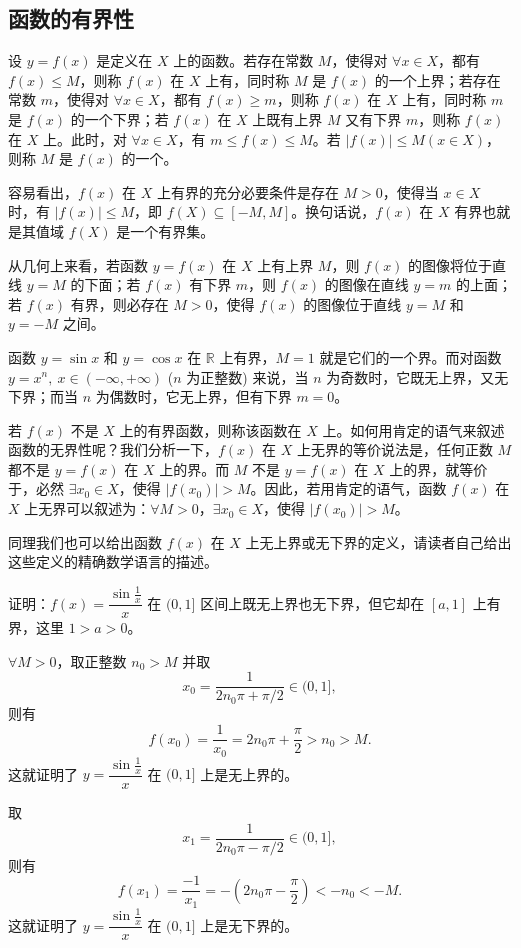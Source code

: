 \documentclass[UTF8,12pt,a4paper,fontset=fandol]{ctexbook}
\begin{document}
\subsection{函数的有界性}

设 $y=f(x)$ 是定义在 $X$ 上的函数。若存在常数 $M$，使得对 $\forall x\in X$，都有 $f(x)\le M$，则称 $f(x)$ 在 $X$ 上有，同时称 $M$ 是 $f(x)$ 的一个上界；若存在常数 $m$，使得对 $\forall x\in X$，都有 $f(x)\ge m$，则称 $f(x)$ 在 $X$ 上有，同时称 $m$ 是 $f(x)$ 的一个下界；若 $f(x)$ 在 $X$ 上既有上界 $M$ 又有下界 $m$，则称 $f(x)$ 在 $X$ 上。此时，对 $\forall x\in X$，有 $m\le f(x)\le M$。若 $|f(x)|\le M(x\in X)$，则称 $M$ 是 $f(x)$ 的一个。

容易看出，$f(x)$ 在 $X$ 上有界的充分必要条件是存在 $M>0$，使得当 $x\in X$ 时，有 $|f(x)|\le M$，即 $f(X)\subseteq[-M,M]$。换句话说，$f(x)$ 在 $X$ 有界也就是其值域 $f(X)$ 是一个有界集。

从几何上来看，若函数 $y=f(x)$ 在 $X$ 上有上界 $M$，则 $f(x)$ 的图像将位于直线 $y=M$ 的下面；若 $f(x)$ 有下界 $m$，则 $f(x)$ 的图像在直线 $y=m$ 的上面；若 $f(x)$ 有界，则必存在 $M>0$，使得 $f(x)$ 的图像位于直线 $y=M$ 和 $y=-M$ 之间。

\noindent{}\quad 函数 $y=\sin x$ 和 $y=\cos x$ 在 $\mathbb{R}$ 上有界，$M=1$ 就是它们的一个界。而对函数 $y=x^n,\ x\in(-\infty,+\infty)$ ($n$ 为正整数) 来说，当 $n$ 为奇数时，它既无上界，又无下界；而当 $n$ 为偶数时，它无上界，但有下界 $m=0$。

若 $f(x)$ 不是 $X$ 上的有界函数，则称该函数在 $X$ 上。如何用肯定的语气来叙述函数的无界性呢？我们分析一下，$f(x)$ 在 $X$ 上无界的等价说法是，任何正数 $M$ 都不是 $y=f(x)$ 在 $X$ 上的界。而 $M$ 不是 $y=f(x)$ 在 $X$ 上的界，就等价于，必然 $\exists x_0\in X$，使得 $|f(x_0)|>M$。因此，若用肯定的语气，函数 $f(x)$ 在 $X$ 上无界可以叙述为：$\forall M>0$，$\exists x_0\in X$，使得 $|f(x_0)|>M$。

同理我们也可以给出函数 $f(x)$ 在 $X$ 上无上界或无下界的定义，请读者自己给出这些定义的精确数学语言的描述。

\noindent{}\quad 证明：$f(x)=\dfrac{\sin\frac1x}{x}$ 在 $(0,1]$ 区间上既无上界也无下界，但它却在 $[a,1]$ 上有界，这里 $1>a>0$。

\noindent{}\quad $\forall M>0$，取正整数 $n_0>M$ 并取
\[
  x_0=\frac{1}{2n_0\pi+\pi/2}\in(0,1],
\]
则有
\[
  f(x_0)=\frac{1}{x_0}=2n_0\pi+\frac{\pi}{2}>n_0>M.
\]
这就证明了 $y=\dfrac{\sin\frac1x}{x}$ 在 $(0,1]$ 上是无上界的。

取
\[
  x_1=\frac{1}{2n_0\pi-\pi/2}\in(0,1],
\]
则有
\[
  f(x_1)=\frac{-1}{x_1}=-\left(2n_0\pi-\frac{\pi}{2}\right)<-n_0<-M.
\]
这就证明了 $y=\dfrac{\sin\frac1x}{x}$ 在 $(0,1]$ 上是无下界的。
\end{document}
